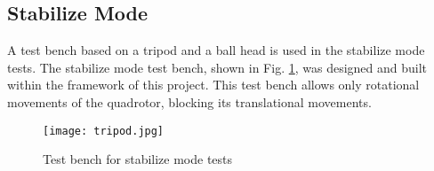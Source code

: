 \subsection{Stabilize Mode}
A test bench based on a tripod and a ball head is used in the stabilize mode tests. The stabilize mode test bench, shown in Fig. \ref{fig:tripod}, was designed and built within the framework of this project. This test bench allows only rotational movements of the quadrotor, blocking its translational movements.

\begin{figure}[h]
\begin{center}
\texttt{[image: tripod.jpg]}  
\caption{Test bench for stabilize mode tests} 
\label{fig:tripod}
\end{center}
\end{figure}

